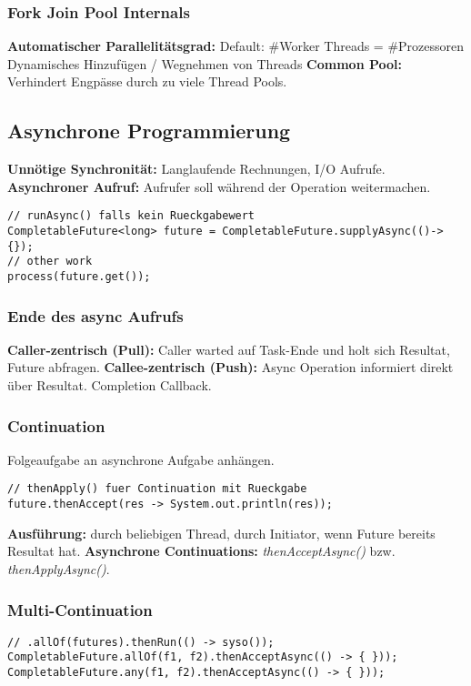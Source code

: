 \subsubsection{Fork Join Pool Internals}
\textbf{Automatischer Parallelitätsgrad:} Default: \#Worker Threads = \#Prozessoren
Dynamisches Hinzufügen / Wegnehmen von Threads
\textbf{Common Pool:} Verhindert Engpässe durch zu viele Thread Pools.


\subsection{Asynchrone Programmierung}
\textbf{Unnötige Synchronität:} Langlaufende Rechnungen, I/O Aufrufe.\\ 
\textbf{Asynchroner Aufruf:} Aufrufer soll während der Operation weitermachen.

\begin{lstlisting}
// runAsync() falls kein Rueckgabewert
CompletableFuture<long> future = CompletableFuture.supplyAsync(()->{});
// other work 
process(future.get());
\end{lstlisting}

\subsubsection{Ende des async Aufrufs}
\textbf{Caller-zentrisch (Pull):} Caller warted auf Task-Ende und holt sich Resultat, Future abfragen.
\textbf{Callee-zentrisch (Push):} Async Operation informiert direkt über Resultat. Completion Callback.

\subsubsection{Continuation}
Folgeaufgabe an asynchrone Aufgabe anhängen.
\begin{lstlisting}
// thenApply() fuer Continuation mit Rueckgabe
future.thenAccept(res -> System.out.println(res));
\end{lstlisting}
\textbf{Ausführung:} durch beliebigen Thread, durch Initiator, wenn Future bereits Resultat hat.
\textbf{Asynchrone Continuations:} \textit{thenAcceptAsync()} bzw. \textit{thenApplyAsync()}.

\subsubsection{Multi-Continuation}
\begin{lstlisting}
// .allOf(futures).thenRun(() -> syso());
CompletableFuture.allOf(f1, f2).thenAcceptAsync(() -> { }));
CompletableFuture.any(f1, f2).thenAcceptAsync(() -> { }));
\end{lstlisting}

